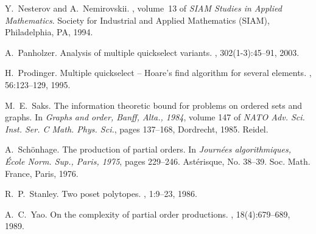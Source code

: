 \documentclass[12pt,oneside]{article}
\begin{document}
\begin{thebibliography}{10}
Y.~Nesterov and A.~Nemirovskii.
,
  volume~13 of {\em SIAM Studies in Applied Mathematics}.
\newblock Society for Industrial and Applied Mathematics (SIAM), Philadelphia,
  PA, 1994.

A.~Panholzer.
\newblock Analysis of multiple quickselect variants.
, 302(1-3):45--91, 2003.

H.~Prodinger.
\newblock Multiple quickselect -- {H}oare's find algorithm for several
  elements.
, 56:123--129, 1995.

M.~E.~Saks.
\newblock The information theoretic bound for problems on ordered sets and
  graphs.
\newblock In {\em Graphs and order, Banff, Alta., 1984}, volume 147 of {\em
  NATO Adv. Sci. Inst. Ser. C Math. Phys. Sci.}, pages 137--168, Dordrecht,
  1985. Reidel.

A.~Sch{\"o}nhage.
\newblock The production of partial orders.
\newblock In {\em Journ\'ees algorithmiques, \'{E}cole {N}orm. {S}up., {P}aris,
  1975}, pages 229--246. Ast\'erisque, No. 38--39. Soc. Math. France, Paris,
  1976.

R.~P.~Stanley.
\newblock Two poset polytopes.
, 1:9--23, 1986.

A.~C.~Yao.
\newblock On the complexity of partial order productions.
, 18(4):679--689, 1989.

\end{thebibliography}
\end{document}
